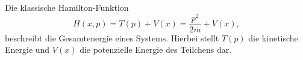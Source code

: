 Die klassische Hamilton-Funktion
\begin{equation}
	H(x, p) = T(p) + V(x) = \frac{p^2}{2m} + V(x),
\end{equation}
beschreibt die Gesamtenergie eines Systems.
Hierbei stellt $T(p)$ die kinetische Energie und $V(x)$ die potenzielle Energie des Teilchens dar.


